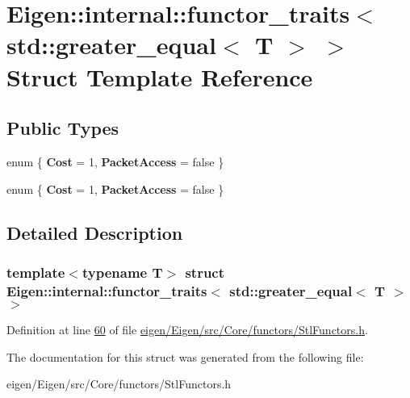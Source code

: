 \hypertarget{struct_eigen_1_1internal_1_1functor__traits_3_01std_1_1greater__equal_3_01_t_01_4_01_4}{}\section{Eigen\+:\+:internal\+:\+:functor\+\_\+traits$<$ std\+:\+:greater\+\_\+equal$<$ T $>$ $>$ Struct Template Reference}
\label{struct_eigen_1_1internal_1_1functor__traits_3_01std_1_1greater__equal_3_01_t_01_4_01_4}
\subsection*{Public Types}
\begin{DoxyCompactItemize}
\item 
\mbox{\label{struct_eigen_1_1internal_1_1functor__traits_3_01std_1_1greater__equal_3_01_t_01_4_01_4_a0f8dab2697bb6fb30476875602224598}} 
enum \{ {\bfseries Cost} = 1, 
{\bfseries Packet\+Access} = false
 \}
\item 
\mbox{\label{struct_eigen_1_1internal_1_1functor__traits_3_01std_1_1greater__equal_3_01_t_01_4_01_4_a8aae23a03e83d9748580b454313c43e3}} 
enum \{ {\bfseries Cost} = 1, 
{\bfseries Packet\+Access} = false
 \}
\end{DoxyCompactItemize}


\subsection{Detailed Description}
\subsubsection*{template$<$typename T$>$\newline
struct Eigen\+::internal\+::functor\+\_\+traits$<$ std\+::greater\+\_\+equal$<$ T $>$ $>$}



Definition at line \hyperlink{eigen_2_eigen_2src_2_core_2functors_2_stl_functors_8h_source_l00060}{60} of file \hyperlink{eigen_2_eigen_2src_2_core_2functors_2_stl_functors_8h_source}{eigen/\+Eigen/src/\+Core/functors/\+Stl\+Functors.\+h}.



The documentation for this struct was generated from the following file\+:\begin{DoxyCompactItemize}
\item 
eigen/\+Eigen/src/\+Core/functors/\+Stl\+Functors.\+h\end{DoxyCompactItemize}
